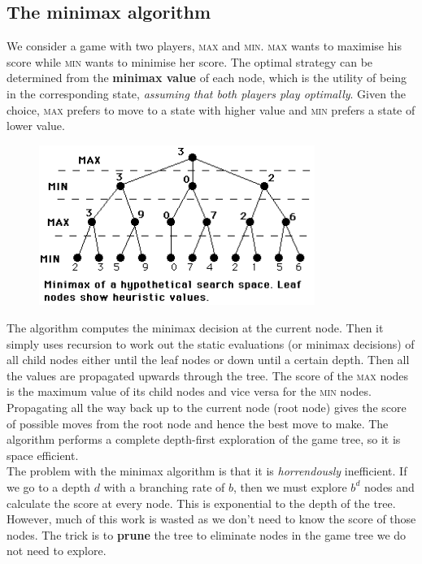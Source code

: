 \documentclass{article}
\newcommand{\n}[0]{\\[\baselineskip]}
\begin{document}
\subsection{The minimax algorithm}
We consider a game with two players, \textsc{max} and \textsc{min}. \textsc{max} wants to maximise his score while \textsc{min} wants to minimise her score. The optimal strategy can be determined from the \textbf{minimax value} of each node, which is the utility of being in the corresponding state, \textit{assuming that both players play optimally}. Given the choice, \textsc{max} prefers to move to a state with higher value and \textsc{min} prefers a state of lower value. 
\begin{figure}[H]
\centering
\includegraphics[width=0.8\textwidth, keepaspectratio]{imgs/minimax.png}
\end{figure}
\noindent
The algorithm computes the minimax decision at the current node. Then it simply uses recursion to work out the static evaluations (or minimax decisions) of all child nodes either until the leaf nodes or down until a certain depth. Then all the values are propagated upwards through the tree. The score of the \textsc{max} nodes is the maximum value of its child nodes and vice versa for the \textsc{min} nodes. Propagating all the way back up to the current node (root node) gives the score of possible moves from the root node and hence the best move to make. The algorithm performs a complete depth-first exploration of the game tree, so it is space efficient. 
\n
The problem with the minimax algorithm is that it is \textit{horrendously} inefficient. If we go to a depth $d$ with a branching rate of $b$, then we must explore $b^{d}$ nodes and calculate the score at every node. This is exponential to the depth of the tree. However, much of this work is wasted as we don't need to know the score of those nodes. The trick is to \textbf{prune} the tree to eliminate nodes in the game tree we do not need to explore.
\end{document}
